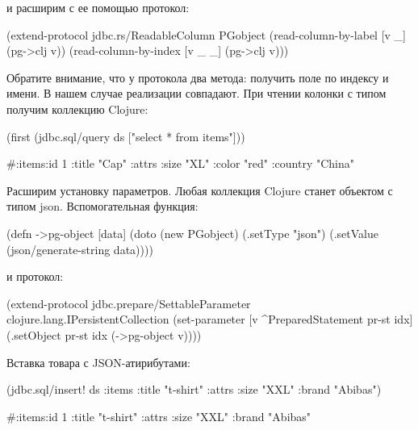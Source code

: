\noindent
и расширим с ее помощью протокол:

\begin{english}
  \begin{clojure}
(extend-protocol jdbc.rs/ReadableColumn
  PGobject
  (read-column-by-label [v _]
    (pg->clj v))
  (read-column-by-index [v _ _]
    (pg->clj v)))
  \end{clojure}
\end{english}

Обратите внимание, что у протокола два метода: получить поле по индексу и имени. В нашем случае реализации совпадают. При чтении колонки с типом  получим коллекцию Clojure:

\begin{english}
  \begin{clojure}
(first (jdbc.sql/query ds ["select * from items"]))

#:items{:id 1
        :title "Cap"
        :attrs {:size "XL"
                :color "red"
                :country "China"}}
  \end{clojure}
\end{english}

Расширим установку параметров. Любая коллекция Clojure станет объектом  с типом json. Вспомогательная функция:

\begin{english}
  \begin{clojure}
(defn ->pg-object [data]
  (doto (new PGobject)
    (.setType "json")
    (.setValue (json/generate-string data))))
  \end{clojure}
\end{english}

\noindent
и протокол:

\begin{english}
  \begin{clojure}
(extend-protocol jdbc.prepare/SettableParameter
  clojure.lang.IPersistentCollection
  (set-parameter [v ^PreparedStatement pr-st idx]
    (.setObject pr-st idx (->pg-object v))))
  \end{clojure}
\end{english}

Вставка товара с JSON-атирибутами:

\begin{english}
  \begin{clojure}
(jdbc.sql/insert!
  ds
  :items
  {:title "t-shirt"
   :attrs {:size "XXL" :brand "Abibas"}})

#:items{:id 1
        :title "t-shirt"
        :attrs {:size "XXL" :brand "Abibas"}}
  \end{clojure}
\end{english}

